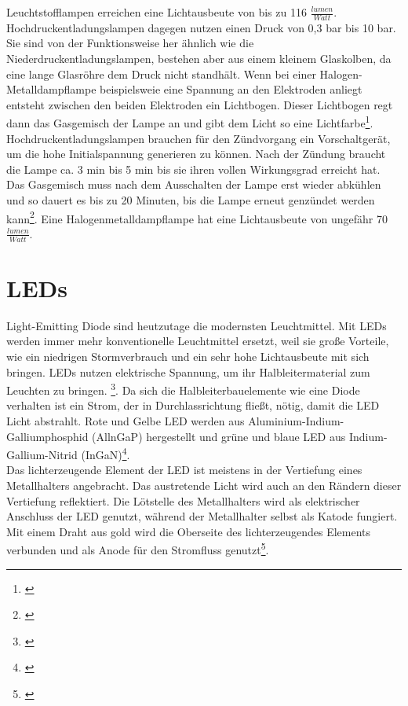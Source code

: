 Leuchtstofflampen erreichen eine Lichtausbeute von bis zu 116 $\frac{lumen}{Watt}$.\\
Hochdruckentladungslampen dagegen nutzen einen Druck von 0,3 bar bis 10 bar. Sie sind von der Funktionsweise her ähnlich wie die Niederdruckentladungslampen, bestehen aber aus einem kleinem Glaskolben, da eine lange Glasröhre dem Druck nicht standhält. Wenn bei einer Halogen-Metalldampflampe beispielsweie eine Spannung an den Elektroden anliegt entsteht zwischen den beiden Elektroden ein Lichtbogen. Dieser Lichtbogen regt dann das Gasgemisch der Lampe an und gibt dem Licht so eine Lichtfarbe\footnote{\cite[129]{ris}}.
Hochdruckentladungslampen brauchen für den Zündvorgang ein Vorschaltgerät, um die hohe Initialspannung generieren zu können. Nach der Zündung braucht die Lampe ca. 3 min bis 5 min bis sie ihren vollen Wirkungsgrad erreicht hat. Das Gasgemisch muss nach dem Ausschalten der Lampe erst wieder abkühlen und so dauert es bis zu 20 Minuten, bis die Lampe erneut genzündet werden kann\footnote{\cite[147]{mueller}}.
Eine Halogenmetalldampflampe hat eine Lichtausbeute von ungefähr 70 $\frac{lumen}{Watt}$.

\section{LEDs} \label{sec_led}
Light-Emitting Diode sind heutzutage die modernsten Leuchtmittel. Mit LEDs werden immer mehr konventionelle Leuchtmittel ersetzt, weil sie große Vorteile, wie ein niedrigen Stormverbrauch und ein sehr hohe Lichtausbeute mit sich bringen. LEDs nutzen elektrische Spannung, um ihr  Halbleitermaterial zum Leuchten zu bringen. \footnote{\cite[150]{mueller}}. Da sich die Halbleiterbauelemente wie eine Diode verhalten ist ein Strom, der in Durchlassrichtung fließt, nötig, damit die LED Licht abstrahlt. Rote und Gelbe LED werden aus Aluminium-Indium-Galliumphosphid (AllnGaP) hergestellt und grüne und blaue LED aus Indium-Gallium-Nitrid (InGaN)\footnote{\cite[153]{ris}}.\\
Das lichterzeugende Element der LED ist meistens in der Vertiefung eines Metallhalters angebracht. Das austretende Licht wird auch an den Rändern dieser Vertiefung reflektiert. Die Lötstelle des Metallhalters wird als elektrischer Anschluss der LED genutzt, während der Metallhalter selbst als Katode fungiert. Mit einem Draht aus gold wird die Oberseite des lichterzeugendes Elements verbunden und als Anode für den Stromfluss genutzt\footnote{\cite[154]{ris}}.     


